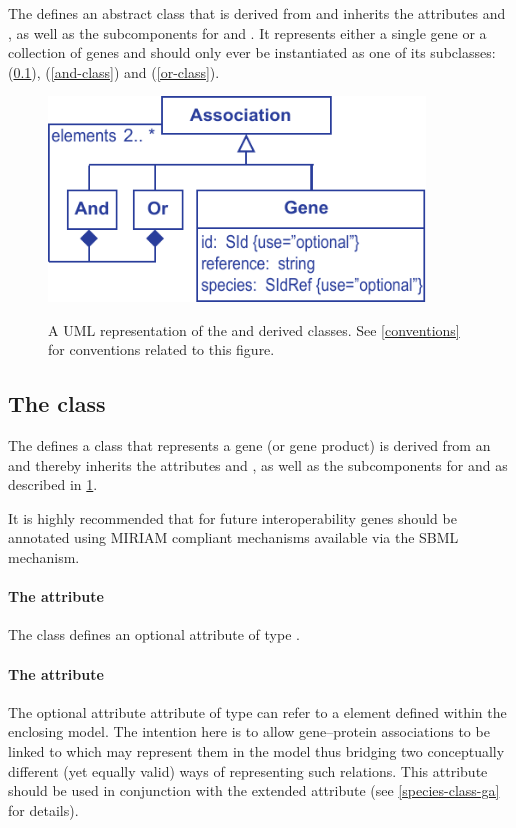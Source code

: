 The \FBCPackage defines an abstract \Association class that is derived from \SBase and inherits the attributes  and , as well as the subcomponents for \Annotation and \Notes. It represents either a single gene or a collection of genes and should only ever be instantiated as one of its subclasses: \Gene (\ref{gene-class}), \GeneAnd (\ref{and-class}) and \GeneOr (\ref{or-class}).

\begin{figure}[h!]
  \centering
  \includegraphics[width=10cm]{images/fbc_uml_ass.pdf}\\
  \caption{A UML representation of the \FBCPackage \Association and derived classes. See \ref{conventions} for conventions related to this figure.}
  \label{fig:fbc_uml_ass}
\end{figure}

\subsection{The \FBC {} class}
\label{gene-class}

The \FBCPackage defines a \Gene class that represents a gene (or gene product) is derived from an \Association and thereby inherits the \SBase attributes  and , as well as the subcomponents for \Annotation and \Notes as described in \ref{fig:fbc_uml_ass}.

It is highly recommended that for future interoperability genes should be annotated using MIRIAM compliant mechanisms available via the SBML \Annotation mechanism.

\paragraph{The  attribute}
The \GeneAssociation class defines an optional attribute  of type .

\paragraph{The  attribute}
The optional attribute  attribute of type  can  refer to a \Species element defined within the enclosing model. The intention here is to allow gene--protein associations to be linked to \Species which may represent them in the model thus bridging two conceptually different (yet equally valid) ways of representing such relations. This attribute should be used in conjunction with the extended \Species attribute  (see \ref{species-class-ga} for details).

